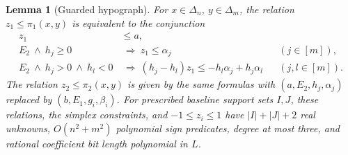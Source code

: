\documentclass[11pt]{article}
\newtheorem{lemma}[theorem]{Lemma}
\theoremstyle{remark}
\begin{document}
\begin{lemma}[Guarded hypograph]\label{lem:hypograph}
For $x\in\Delta_n$, $y\in\Delta_m$, the relation $z_1\le\pi_1(x,y)$ is equivalent to the conjunction
\begin{align}
 z_1&\le a,\label{eq:base}\\
 E_2\ \wedge\ h_j\ge0&\ \Longrightarrow\ z_1\le\alpha_j
                   &&(j\in[m]),\label{eq:pure}\\
 E_2\ \wedge\ h_j>0\ \wedge\ h_l<0
 &\ \Longrightarrow\
 (h_j-h_l)z_1\le-h_l\alpha_j+h_j\alpha_l
                   &&(j,l\in[m]).\label{eq:edge}
\end{align}
The relation $z_2\le\pi_2(x,y)$ is given by the same formulas with
$(a,E_2,h_j,\alpha_j)$ replaced by $(b,E_1,g_i,\beta_i)$.
For prescribed baseline support sets $I,J$, these relations, the simplex constraints, and $-1\le z_i\le1$ have $|I|+|J|+2$ real unknowns, $O(n^2+m^2)$ polynomial sign predicates, degree at most three, and rational coefficient bit length polynomial in $L$.
\end{lemma}
\end{document}
